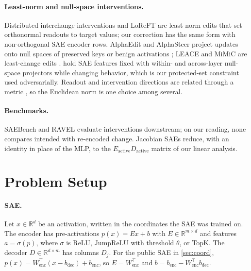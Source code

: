 \documentclass{article}
\theoremstyle{plain}
\theoremstyle{definition}
\theoremstyle{remark}
\newcommand{\R}{\mathbb{R}}
\begin{document}
\paragraph{Least-norm and null-space interventions.}
Distributed interchange interventions \citep{geiger2024finding} and LoReFT
\citep{wu2024reft} are least-norm edits that set orthonormal readouts to target values; our
correction has the same form with non-orthogonal SAE encoder rows. AlphaEdit and AlphaSteer
project updates onto null spaces of preserved keys or benign activations
\citep{fang2025alphaedit,sheng2026alphasteer}; LEACE and MiMiC are least-change edits
\citep{belrose2025leace,singh2025representation}. \citet{cui2026sae} hold SAE features fixed
with within- and across-layer null-space projectors while changing behavior, which is our
protected-set constraint used adversarially. Readout and intervention directions are related
through a metric \citep{park2024linear}, so the Euclidean norm is one choice among several.

\paragraph{Benchmarks.}
SAEBench \citep{karvonen2025saebench} and RAVEL
\citep{huang2024ravel,chaudhary2024evaluating} evaluate interventions downstream; on our
reading, none compares intended with re-encoded change. Jacobian SAEs
\citep{farnik2025jacobian} reduce, with an identity in place of the MLP, to the
$E_{\mathrm{active}}D_{\mathrm{active}}$ matrix of our linear analysis.

\section{Problem Setup}
\label{sec:setup}

\paragraph{SAE.}
Let $x\in\R^d$ be an activation, written in the coordinates the SAE was trained on. The
encoder has pre-activations $p(x) = Ex + b$ with $E\in\R^{m\times d}$ and features
$a = \sigma(p)$, where $\sigma$ is ReLU, JumpReLU with threshold $\theta$, or TopK. The decoder
$D\in\R^{d\times m}$ has columns $D_j$. For the public SAE in \cref{sec:coord},
$p(x) = W_{\mathrm{enc}}^{\top}(x - b_{\mathrm{dec}}) + b_{\mathrm{enc}}$, so
$E = W_{\mathrm{enc}}^{\top}$ and $b = b_{\mathrm{enc}} - W_{\mathrm{enc}}^{\top}b_{\mathrm{dec}}$.
\end{document}

